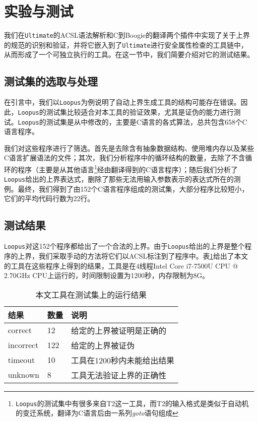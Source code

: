 \section{实验与测试}

我们在\texttt{Ultimate}的ACSL语法解析和C到Boogie的翻译两个插件中实现了关于上界的规范的识别和验证，并将它嵌入到了\texttt{Ultimate}进行安全属性检查的工具链中，从而形成了一个可独立执行的工具。在这一节中，我们简要介绍对它的测试结果。

\subsection{测试集的选取与处理}

在引言中，我们以\texttt{Loopus}为例说明了自动上界生成工具的结构可能存在错误。因此，\texttt{Loopus}的测试集比较适合对本工具的验证效果，尤其是证伪的能力进行测试。\texttt{Loopus}的测试集是从\cite{brockschmidt_alternating_2014}中修改的，主要是C语言的各式算法，总共包含658个C语言程序。

我们对这些程序进行了筛选。首先是去除含有抽象数据结构、使用堆内存以及某些C语言扩展语法的文件；其次，我们分析程序中的循环结构的数量，去除了不含循环的程序（主要是从其他语言\footnote{\texttt{Loopus}的测试集中有很多来自T2这一工具，而T2的输入格式是类似于自动机的变迁系统，翻译为C语言后由一系列\textit{goto}语句组成}经由翻译得到的C语言程序）；随后我们分析了\texttt{Loopus}给出的上界表达式，删除了那些无法用输入参数表示的表达式所在的测例。最终，我们得到了由152个C语言程序组成的测试集，大部分程序比较短小，它们的平均代码行数为22行。

\subsection{测试结果}

\texttt{Loopus}对这152个程序都给出了一个合法的上界。由于\texttt{Loopus}给出的上界是整个程序的上界，我们采取手动的方法将它们以ACSL标注到了程序中。表\ref{tab:chap4-result}给出了本文的工具在这些程序上得到的结果，工具是在4线程Intel\textregistered{} Core\texttrademark{} i7-7500U CPU @ 2.70GHz CPU上运行的，时间限制设置为1200秒，内存限制为8G。

\begin{table}[t]
  \centering
  \caption{本文工具在测试集上的运行结果}
  \begin{tabular}{lll}
    \toprule
    结果  & 数量 & 说明                        \\
    \midrule
    correct   & 12 & 给定的上界被证明是正确的 \\
    incorrect   & 122 & 给定的上界被证伪                   \\
    timeout  & 10   & 工具在1200秒内未能给出结果 \\
    unknown & 8 & 工具无法验证上界的正确性 \\
    \bottomrule
  \end{tabular}
  \label{tab:chap4-result}
\end{table} 

